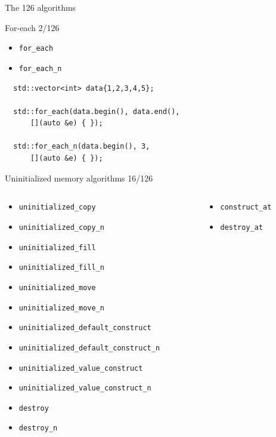 \documentclass[aspectratio=169]{beamer}
\begin{document}
\begin{frame}[c]
  \begin{center}
    \LARGE The 126 algorithms
  \end{center}
\end{frame}

\begin{frame}{For-each 2/126}
  \begin{itemize}
    \item{\texttt{for_each}}
    \item{\texttt{for_each_n}}
  \end{itemize}
\end{frame}

\begin{frame}[fragile]{}
\begin{verbatim}
  std::vector<int> data{1,2,3,4,5};

  std::for_each(data.begin(), data.end(),
      [](auto &e) { });

  std::for_each_n(data.begin(), 3,
      [](auto &e) { });
\end{verbatim}
\end{frame}

\begin{frame}{Uninitialized memory algorithms 16/126}
\footnotesize
 \begin{columns}
  \begin{column}{0.6\textwidth}
  \begin{itemize}
    \item{\texttt{uninitialized_copy}}
    \item{\texttt{uninitialized_copy_n}}
    \item{\texttt{uninitialized_fill}}
    \item{\texttt{uninitialized_fill_n}}
    \item{\texttt{uninitialized_move}}
    \item{\texttt{uninitialized_move_n}}
    \item{\texttt{uninitialized_default_construct}}
    \item{\texttt{uninitialized_default_construct_n}}
    \item{\texttt{uninitialized_value_construct}}
    \item{\texttt{uninitialized_value_construct_n}}
    \item{\texttt{destroy}}
    \item{\texttt{destroy_n}}
  \end{itemize}
  \end{column}
  \begin{column}{0.4\textwidth}
  \begin{itemize}
    \item{\texttt{construct_at}}
    \item{\texttt{destroy_at}}
  \end{itemize}
  \end{column}
\end{columns}
\end{frame}
\end{document}
